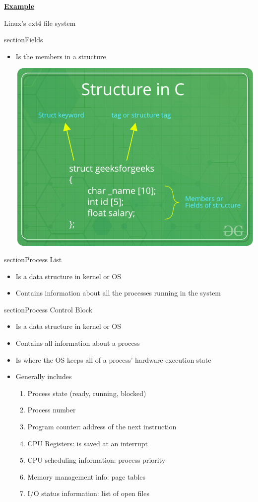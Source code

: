 \documentclass[12pt]{article}
\begin{document}
\bigskip

\underline{\textbf{Example}}

\bigskip

Linux's ext4 file system

\*section{Fields}

\begin{itemize}
    \item Is the members in a structure

    \bigskip

    \begin{center}
    \includegraphics[width=0.6\linewidth]{images/midterm_1_solution_15.png}
    \end{center}
\end{itemize}

\*section{Process List}

\begin{itemize}
    \item Is a data structure in kernel or OS
    \item Contains information about all the processes running in the system
\end{itemize}

\*section{Process Control Block}

\begin{itemize}
    \item Is a data structure in kernel or OS
    \item Contains all information about a process
    \item Is where the OS keeps all of a process' hardware execution state
    \item Generally includes

    \begin{enumerate}[1.]
        \item Process state (ready, running, blocked)
        \item Process number
        \item Program counter: address of the next instruction
        \item CPU Registers: is saved at an interrupt
        \item CPU scheduling information: process priority
        \item Memory management info: page tables
        \item I/O status information: list of open files
    \end{enumerate}
\end{itemize}
\end{document}
